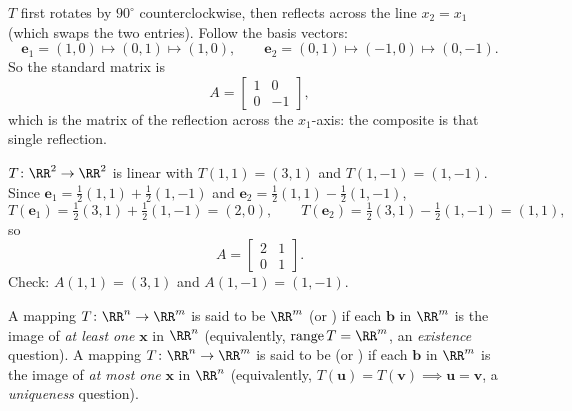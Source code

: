 \documentclass[10pt]{scrartcl}
\newcommand{\vv}[1]{\mathbf{#1}}
\begin{document}
\begin{example*}
$T$ first rotates by $90^\circ$ counterclockwise, then reflects across the line $x_2=x_1$ (which swaps the two entries). Follow the basis vectors:
\[
  \vv e_1=(1,0)\mapsto(0,1)\mapsto(1,0),\qquad \vv e_2=(0,1)\mapsto(-1,0)\mapsto(0,-1).
\]
So the standard matrix is
\[
  A=\begin{bmatrix}1&0\\0&-1\end{bmatrix},
\]
which is the matrix of the reflection across the $x_1$-axis: the composite is that single reflection.
\end{example*}

\begin{example*}
$T\colon\RR^2\to\RR^2$ is linear with $T(1,1)=(3,1)$ and $T(1,-1)=(1,-1)$. Since $\vv e_1=\tfrac12(1,1)+\tfrac12(1,-1)$ and $\vv e_2=\tfrac12(1,1)-\tfrac12(1,-1)$,
\[
  T(\vv e_1)=\tfrac12(3,1)+\tfrac12(1,-1)=(2,0),\qquad T(\vv e_2)=\tfrac12(3,1)-\tfrac12(1,-1)=(1,1),
\]
so
\[
  A=\begin{bmatrix}2&1\\0&1\end{bmatrix}.
\]
Check: $A(1,1)=(3,1)$ and $A(1,-1)=(1,-1)$.
\end{example*}

\begin{definition*}
  \begin{itemize}
    \ii A mapping $T\colon\RR^n\to\RR^m$ is said to be  $\RR^m$ (or ) if each $\vv b$ in $\RR^m$ is the image of \emph{at least one} $\vv x$ in $\RR^n$ (equivalently, $\range T=\RR^m$, an \emph{existence} question).
    \ii A mapping $T\colon\RR^n\to\RR^m$ is said to be  (or ) if each $\vv b$ in $\RR^m$ is the image of \emph{at most one} $\vv x$ in $\RR^n$ (equivalently, $T(\vv u)=T(\vv v)\implies\vv u=\vv v$, a \emph{uniqueness} question).
  \end{itemize}
\end{definition*}
\end{document}
